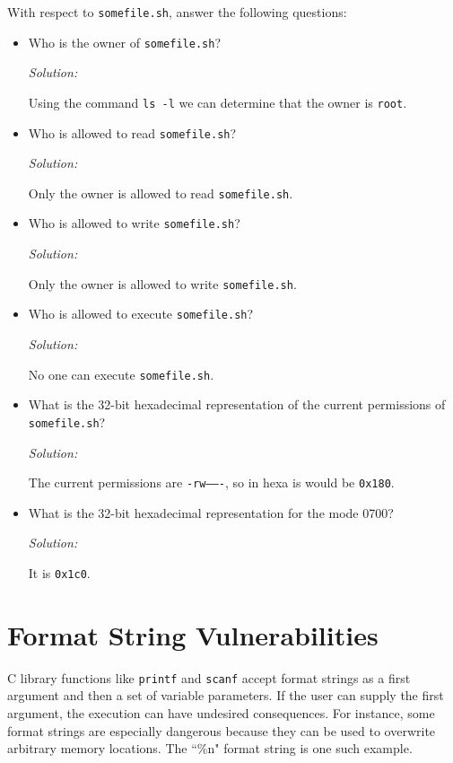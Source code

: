 \documentclass[a4paper,11pt]{article}
\newenvironment{solution}%
{\par{\noindent\small\textit{Solution:}}\vspace{-12pt}\begin{framed}}%
{\end{framed}\par}
\begin{document}
\noindent With respect to \texttt{somefile.sh}, answer the following questions:
\begin{itemize}
\item Who is the owner of \texttt{somefile.sh}?
\ifsolution\begin{solution}
Using the command \texttt{ls -l} we can determine that the owner is \texttt{root}.
\end{solution}\fi

\item Who is allowed to read \texttt{somefile.sh}?
\ifsolution\begin{solution}
Only the owner is allowed to read \texttt{somefile.sh}.
\end{solution}\fi
\item Who is allowed to write \texttt{somefile.sh}?
\ifsolution\begin{solution}
Only the owner is allowed to write \texttt{somefile.sh}.
\end{solution}\fi
\item Who is allowed to execute \texttt{somefile.sh}?
\ifsolution\begin{solution}
No one can execute \texttt{somefile.sh}.
\end{solution}\fi
\item What is the 32-bit hexadecimal representation of the current permissions
  of \texttt{somefile.sh}?
\ifsolution\begin{solution}
The current permissions are \texttt{-rw-------}, so in hexa is would be \texttt{0x180}.
\end{solution}\fi
\item What is the 32-bit hexadecimal representation for the mode 0700? 
\ifsolution\begin{solution}
It is \texttt{0x1c0}.
\end{solution}\fi
\end{itemize}

\section*{Format String Vulnerabilities}

C library functions like \texttt{printf} and \texttt{scanf} accept format
strings as a first argument and then a set of variable parameters. If the user
can supply the first argument, the execution can have undesired consequences.
For instance, some format strings are especially dangerous because they can be
used to overwrite arbitrary memory locations. The ``\%n" format string is one
such example. 
\end{document}
